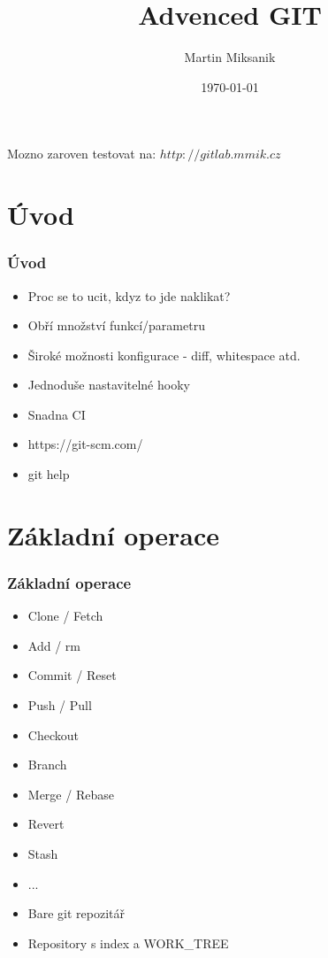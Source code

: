 \documentclass{beamer}
\title{Advenced GIT}
\author{Martin Miksanik}
\date{\today}
\begin{document}
\begin{frame}
  \titlepage
  \vspace{1cm}
  Mozno zaroven testovat na: $http://gitlab.mmik.cz$
\end{frame}


\frame{\tableofcontents}

\section{Úvod}
\begin{frame}
  \frametitle{Úvod}
  \begin{itemize}
    \item Proc se to ucit, kdyz to jde naklikat?
    \item Obří množství funkcí/parametru
    \item Široké možnosti konfigurace - diff, whitespace atd.
    \item Jednoduše nastavitelné hooky
    \item Snadna CI
    
    \item https://git-scm.com/
    \item git help    
  \end{itemize}
\end{frame}

\section{Základní operace}
\begin{frame}
  \frametitle{Základní operace}
  \begin{itemize}
    \item Clone / Fetch
    \item Add / rm
    \item Commit / Reset
    \item Push / Pull
    \item Checkout
    \item Branch 
    \item Merge / Rebase
    \item Revert
    \item Stash
    \item ...
  \end{itemize}
  
  \begin{itemize}
   \item Bare git repozitář
   \item Repository s index a WORK\_TREE
  \end{itemize}
\end{frame}
\end{document}
